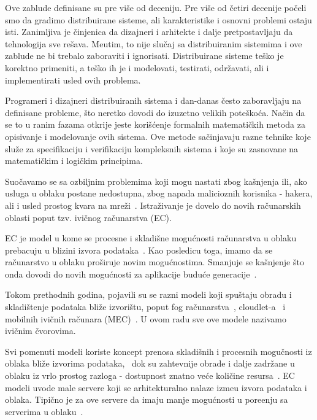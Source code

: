 Ove zablude definisane su pre vi\v se od deceniju. Pre vi\v se od \v cetiri decenije po\v celi smo da gradimo distribuirane sisteme, ali karakteristike i osnovni problemi ostaju isti. Zanimljiva je \v cinjenica da dizajneri i arhitekte i dalje pretpostavljaju da tehnologija sve re\v sava. Me\dj utim, to nije slu\v caj sa distribuiranim sistemima i ove zablude ne bi trebalo zaboraviti i ignorisati. Distribuirane sisteme te\v sko je korektno primeniti, a te\v sko ih je i modelovati, testirati, odr\v zavati, ali i implementirati usled ovih problema.

Programeri i dizajneri distribuiranih sistema i dan-danas \v cesto zaboravljaju na definisane probleme, \v sto neretko dovodi do izuzetno velikih pote\v sko\'ca. Na\v cin da se to u ranim fazama otkrije jeste kori\v s\'cenje formalnih matemati\v ckih metoda za opisivanje i modelovanje ovih sistema. Ove metode sa\v cinjavaju razne tehnike koje slu\v ze za specifikaciju i verifikaciju kompleksnih sistema i koje su zasnovane na matemati\v ckim i logi\v ckim principima.

Suo\v cavamo se sa ozbiljnim problemima koji mogu nastati zbog ka\v snjenja ili, ako usluga u oblaku postane nedostupna, zbog napada malicioznih korisnika - hakera, ali i usled prostog kvara na mre\v zi~\cite{GunawiHSLSAE16}. Istra\v zivanje je dovelo do novih ra\v cunarskih oblasti poput tzv. ivi\v cnog ra\v cunarstva (EC). 

EC je model u kome se procesne i skladi\v sne mogu\'cnosti ra\v cunarstva u oblaku prebacuju u blizini izvora podataka~\cite{Satyanarayanan17}. Kao posledicu toga, imamo da se ra\v cunarstvo u oblaku pro\v siruje novim mogu\'cnostima. Smanjuje se ka\v snjenje \v sto onda dovodi do novih mogu\'cnosti za aplikacije budu\'ce generacije~\cite{NingLSY20}. 

Tokom prethodnih godina, pojavili su se razni modeli koji spu\v staju obradu i skladi\v stenje podataka bli\v ze izvori\v stu, poput fog ra\v cunarstva~\cite{BonomiMNZ14}, cloudlet-a~\cite {MonsalveCC18} i mobilnih ivi\v cnih ra\v cunara (MEC)~\cite{WangZZWYW17}. U ovom radu sve ove modele nazivamo ivi\v cnim \v cvorovima. 

Svi pomenuti modeli koriste koncept prenosa skladi\v snih i procesnih mogu\v cnosti iz oblaka bli\v ze izvorima podataka,~\cite{KhuneP19} dok su zahtevnije obrade i dalje zadr\v zane u oblaku iz vrlo prostog razloga - dostupnost znatno ve\'ce koli\v cine resursa~\cite{NingLSY20}. EC modeli uvode male servere koji se arhitekturalno nalaze izme\dj u izvora podataka i oblaka. Tipi\v cno je za ove servere da imaju manje mogu\'cnosti u pore\dj enju sa serverima u oblaku~\cite{ChenHLLW15}. 

